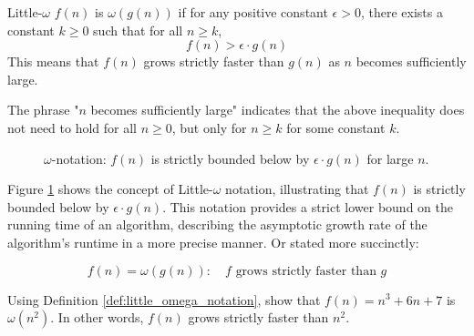 \begin{definition}{Little-$\omega$}\label{def:little_omega_notation}
    $f(n)$ is $\omega(g(n))$ if for any positive constant $\epsilon > 0$, there exists a constant $k \geq 0$ such that for all $n \geq k$,
    \medskip
    \[
    f(n) > \epsilon \cdot g(n)
    \]
    \medskip
    This means that $f(n)$ grows strictly faster than $g(n)$ as $n$ becomes sufficiently large.
\end{definition}

The phrase "$n$ becomes sufficiently large" indicates that the above inequality does not need to hold for all $n \geq 0$, but only for $n \geq k$ for some constant $k$.

\begin{figure}[htbp]
    \centering
    \caption{$\omega$-notation: $f(n)$ is strictly bounded below by $\epsilon \cdot g(n)$ for large $n$.}
    \label{fig:little_omega_notation}
\end{figure}

Figure \ref{fig:little_omega_notation} shows the concept of Little-$\omega$ notation, illustrating that $f(n)$ is strictly bounded below by $\epsilon \cdot g(n)$. This notation provides a strict lower bound on the running time of an algorithm, describing the asymptotic growth rate of the algorithm's runtime in a more precise manner. Or stated more succinctly:

\[
f(n)=\omega(g(n)): \quad f \text{ grows strictly faster than } g
\]

\begin{example}
    Using Definition \ref{def:little_omega_notation}, show that $f(n)=n^3 + 6n + 7$ is $\omega(n^2)$. In other words, $f(n)$ grows strictly faster than $n^2$.
\end{example}

